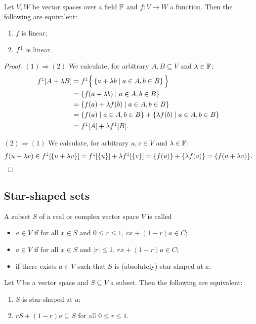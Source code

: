\begin{lemma} \label{linearImageFunction}
Let $V,W$ be vector spaces over a field $\mathbb{F}$ and $f: V\to W$ a function. Then the following are equivalent:
\begin{enumerate}
\item $f$ is linear;
\item $f^\downarrow$ is linear.
\end{enumerate}
\end{lemma}
\begin{proof}
$(1) \Rightarrow (2)$ We calculate, for arbitrary $A,B\subseteq V$ and $\lambda\in \mathbb{F}$:
\begin{align*}
f^\downarrow[A+\lambda B] &= f^\downarrow\Big\{\left\{ a+\lambda b \;\middle|\; a\in A, b\in B \right\}\Big\} \\
&= \left\{ f(a+\lambda b) \;\middle|\; a\in A, b\in B \right\} \\
&= \left\{ f(a)+\lambda f(b) \;\middle|\; a\in A, b\in B \right\} \\
&= \left\{ f(a) \;\middle|\; a\in A, b\in B \right\} + \left\{ \lambda f(b) \;\middle|\; a\in A, b\in B \right\} \\
&= f^\downarrow[A]+ \lambda f^\downarrow[B].
\end{align*}

$(2) \Rightarrow (1)$ We calculate, for arbitrary $u,v\in V$ and $\lambda\in \mathbb{F}$:
\[ f(u+\lambda v) \in f^\downarrow[\{u+\lambda v\}] = f^\downarrow[\{u\}] + \lambda f^\downarrow[\{v\}] = \{f(u)\} +\{\lambda f(v)\} = \{f(u+\lambda v)\}. \]
\end{proof}

\subsection{Star-shaped sets}
\begin{definition}
A subset $S$ of a real or complex vector space $V$ is called
\begin{itemize}
\item {} $a\in V$ if for all $x\in S$ and $0\leq r \leq 1$, $rx + (1-r)a\in C$;
\item {} $a\in V$ if for all $x\in S$ and $|r| \leq 1$, $rx + (1-r)a\in C$;
\item {} if there exists $a\in V$ such that $S$ is (absolutely) star-shaped at $a$.
\end{itemize}
\end{definition}

\begin{lemma}
Let $V$ be a vector space and $S\subseteq V$ a subset. Then the following are equivalent:
\begin{enumerate}
\item $S$ is star-shaped at $a$;
\item $r S + (1-r)a \subseteq S$ for all $0\leq r \leq 1$.
\end{enumerate}
\end{lemma}

